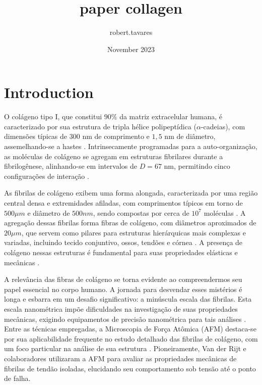 \documentclass{article}
\title{paper collagen}
\author{robert.tavares}
\date{November 2023}
\begin{document}
\maketitle

\section{Introduction}

    O colágeno tipo I, que constitui $90\%$ da matriz extracelular humana, é caracterizado por sua estrutura de tripla hélice 
    polipeptídica ($\alpha$-cadeias), com dimensões típicas de $300$ nm de comprimento e $1,5$ nm de diâmetro, assemelhando-se 
    a hastes \cite{Gelse2003,Silver2018}. Intrinsecamente programadas para a auto-organização, as moléculas de colágeno se 
    agregam em estruturas fibrilares durante a fibrilogênese, alinhando-se em intervalos de $D=67$ nm, permitindo cinco 
    configurações de interação \cite{Zhu2018, KADLER1996}. 
    
    As fibrilas de colágeno exibem uma forma alongada, caracterizada por uma região central densa e extremidades afiladas, 
    com comprimentos típicos em torno de \(500 \mu m\) e diâmetro de \(500 nm\), sendo compostas por cerca de \(10^{7}\) moléculas 
    \cite{Charvolin2019, KADLER1996, Parry1984}. A agregação dessas fibrilas forma fibras de colágeno, com diâmetros aproximados 
    de \(20 \mu m\), que servem como pilares para estruturas hierárquicas mais complexas e variadas, incluindo tecido conjuntivo, 
    ossos, tendões e córnea \cite{RicoLlanos2021}. A presença de colágeno nessas estruturas é fundamental para suas propriedades 
    elásticas e mecânicas \cite{Silver2018}. 

    A relevância das fibras de colágeno se torna evidente ao compreendermos seu papel essencial no corpo humano. A jornada para 
    desvendar esses mistérios é longa e esbarra em um desafio significativo: a minúscula escala das fibrilas. Esta escala nanométrica 
    impõe dificuldades na investigação de suas propriedades mecânicas, exigindo equipamentos de precisão nanométrica para tais análises 
    \cite{Nalbach2022InstrumentFT}. Entre as técnicas empregadas, a Microscopia de Força Atômica (AFM) destaca-se por sua aplicabilidade
    frequente no estudo detalhado das fibrilas de colágeno, com um foco particular na análise de sua estrutura 
    \cite{Andriotis2015-lx,Mull2022-br}. Pioneiramente, Van der Rijt e colaboradores \cite{Rijt} utilizaram a AFM para avaliar as 
    propriedades mecânicas de fibrilas de tendão isoladas, elucidando seu comportamento sob tensão até o ponto de falha. 
\end{document}
